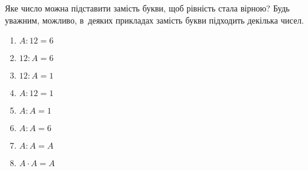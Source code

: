\problem
Яке число можна підставити замість букви, щоб рівність стала вірною?
Будь уважним, можливо, в~деяких прикладах замість букви підходить декілька чисел.
\begin{multicols}{2}
  \begin{enumerate}
    \item $A : 12 = 6$
    \item $12 : A = 6$
    \item $12 : A = 1$
    \item $A : 12 = 1$
    \item $A : A = 1$
    \item $A : A = 6$
    \item $A : A = A$
    \item $A \cdot A = A$
  \end{enumerate}
\end{multicols}
